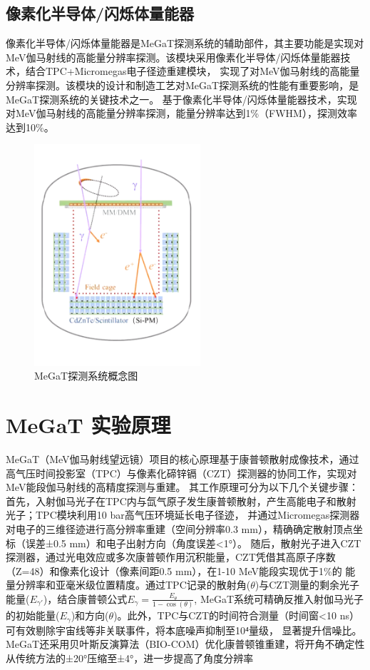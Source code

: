 \subsection{像素化半导体/闪烁体量能器}
	像素化半导体/闪烁体量能器是MeGaT探测系统的辅助部件，其主要功能是实现对MeV伽马射线的高能量分辨率探测。该模块采用像素化半导体/闪烁体量能器技术，结合TPC+Micromegas电子径迹重建模块，
	实现了对MeV伽马射线的高能量分辨率探测。该模块的设计和制造工艺对MeGaT探测系统的性能有重要影响，是MeGaT探测系统的关键技术之一。
	基于像素化半导体/闪烁体量能器技术，实现对MeV伽马射线的高能量分辨率探测，能量分辨率达到1\%（FWHM），探测效率达到10\%。
	\begin{figure}
		\centering
		\includegraphics[width=0.55\textwidth]{figures/MeGaT.png}
		\caption{MeGaT探测系统概念图}
	\end{figure}

\section{MeGaT 实验原理}
MeGaT（MeV伽马射线望远镜）项目的核心原理基于康普顿散射成像技术，通过高气压时间投影室（TPC）与像素化碲锌镉（CZT）探测器的协同工作，实现对MeV能段伽马射线的高精度探测与重建。
其工作原理可分为以下几个关键步骤：首先，入射伽马光子在TPC内与氙气原子发生康普顿散射，产生高能电子和散射光子；TPC模块利用10 bar高气压环境延长电子径迹，
并通过Micromegas探测器对电子的三维径迹进行高分辨率重建（空间分辨率0.3 mm），精确确定散射顶点坐标（误差±0.5 mm）和电子出射方向（角度误差<1°）。
随后，散射光子进入CZT探测器，通过光电效应或多次康普顿作用沉积能量，CZT凭借其高原子序数（Z=48）和像素化设计（像素间距0.5 mm），在1-10 MeV能段实现优于1\%的
能量分辨率和亚毫米级位置精度。通过TPC记录的散射角($\theta$)与CZT测量的剩余光子能量($E_{\gamma'}$)，结合康普顿公式$E_{\gamma} = \frac{E_{\theta}}{1-\cos (\theta)}$,
MeGaT系统可精确反推入射伽马光子的初始能量($E_{\gamma}$)和方向($\theta$)。此外，TPC与CZT的时间符合测量（时间窗<10 ns）可有效剔除宇宙线等非关联事件，将本底噪声抑制至10⁴量级，
显著提升信噪比。MeGaT还采用贝叶斯反演算法（BIO-COM）优化康普顿锥重建，将开角不确定性从传统方法的±20°压缩至±4°，进一步提高了角度分辨率

